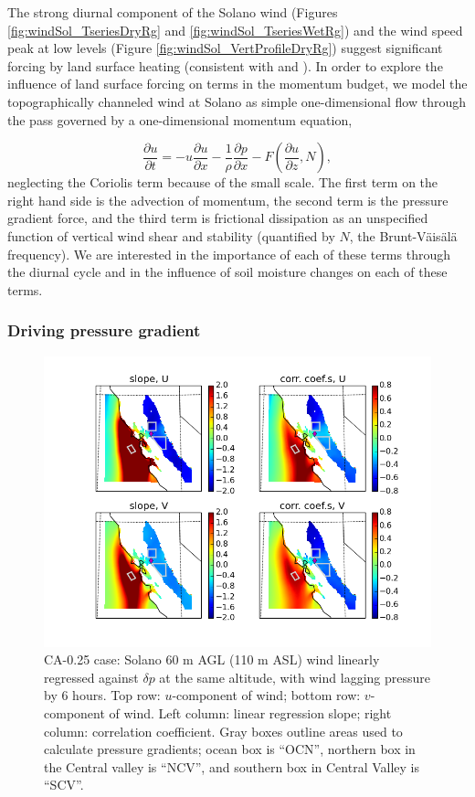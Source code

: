 The strong diurnal component of the Solano wind (Figures \ref{fig:windSol_TseriesDryRg} and \ref{fig:windSol_TseriesWetRg}) and the wind speed peak at low levels (Figure \ref{fig:windSol_VertProfileDryRg}) suggest significant forcing by land surface heating (consistent with \cite{zhong2004diurnal} and \cite{mansbach2010synoptic}).  In order to explore the influence of land surface forcing on terms in the momentum budget, we model the topographically channeled wind at Solano as simple one-dimensional flow through the pass governed by a one-dimensional momentum equation,

\begin{equation}
\frac{\partial u}{\partial t} = -u\frac{\partial u}{\partial x} -\frac{1}{\rho} \frac{\partial p}{\partial x} - F\left(\frac{\partial u}{\partial z}, N\right),
\label{eqn:windSol_momentum}
\end{equation}
neglecting the Coriolis term because of the small scale.  The first term on the right hand side is the advection of momentum, the second term is the pressure gradient force, and the third term is frictional dissipation as an unspecified function of vertical wind shear and stability (quantified by $N$, the Brunt-V\"ais\"al\"a frequency).  We are interested in the importance of each of these terms through the diurnal cycle and in the influence of soil moisture changes on each of these terms.

\subsubsection{Driving pressure gradient}

\begin{figure}[here]
\includegraphics[width=1\textwidth]{ch3-wind/img/corr_wind_panom_lev110_lag12_CA0pt25.png}
\caption{CA-0.25 case: Solano 60 m AGL (110 m ASL) wind linearly regressed against $\delta p$ at the same altitude, with wind lagging pressure by 6 hours.  Top row: $u$-component of wind; bottom row: $v$-component of wind.  Left column: linear regression slope; right column: correlation coefficient.  Gray boxes outline areas used to calculate pressure gradients; ocean box is ``OCN'', northern box in the Central valley is ``NCV'', and southern box in Central Valley is ``SCV''.}
\label{fig:windSol_CorrMap0pt25}
\end{figure}

